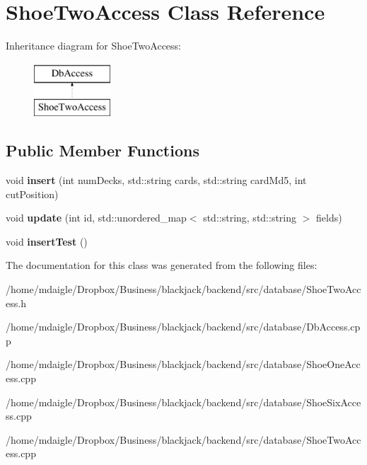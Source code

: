 \hypertarget{classShoeTwoAccess}{
\section{\-Shoe\-Two\-Access \-Class \-Reference}
\label{d5/d18/classShoeTwoAccess}
}
\-Inheritance diagram for \-Shoe\-Two\-Access\-:\begin{figure}[H]
\begin{center}
\leavevmode
\includegraphics[height=2.000000cm]{d5/d18/classShoeTwoAccess}
\end{center}
\end{figure}
\subsection*{\-Public \-Member \-Functions}
\begin{DoxyCompactItemize}
\item 
\hypertarget{classShoeTwoAccess_a13c015abcde2c12aedb96906883ddd67}{
void {\bfseries insert} (int num\-Decks, std\-::string cards, std\-::string card\-Md5, int cut\-Position)}
\label{d5/d18/classShoeTwoAccess_a13c015abcde2c12aedb96906883ddd67}

\item 
\hypertarget{classShoeTwoAccess_a9c884b5cec8c7453a36bc0c14a5b8f6f}{
void {\bfseries update} (int id, std\-::unordered\-\_\-map$<$ std\-::string, std\-::string $>$ fields)}
\label{d5/d18/classShoeTwoAccess_a9c884b5cec8c7453a36bc0c14a5b8f6f}

\item 
\hypertarget{classShoeTwoAccess_ab408e44f340297526a1fecc79cd52c18}{
void {\bfseries insert\-Test} ()}
\label{d5/d18/classShoeTwoAccess_ab408e44f340297526a1fecc79cd52c18}

\end{DoxyCompactItemize}


\-The documentation for this class was generated from the following files\-:\begin{DoxyCompactItemize}
\item 
/home/mdaigle/\-Dropbox/\-Business/blackjack/backend/src/database/\-Shoe\-Two\-Access.\-h\item 
/home/mdaigle/\-Dropbox/\-Business/blackjack/backend/src/database/\-Db\-Access.\-cpp\item 
/home/mdaigle/\-Dropbox/\-Business/blackjack/backend/src/database/\-Shoe\-One\-Access.\-cpp\item 
/home/mdaigle/\-Dropbox/\-Business/blackjack/backend/src/database/\-Shoe\-Six\-Access.\-cpp\item 
/home/mdaigle/\-Dropbox/\-Business/blackjack/backend/src/database/\-Shoe\-Two\-Access.\-cpp\end{DoxyCompactItemize}
